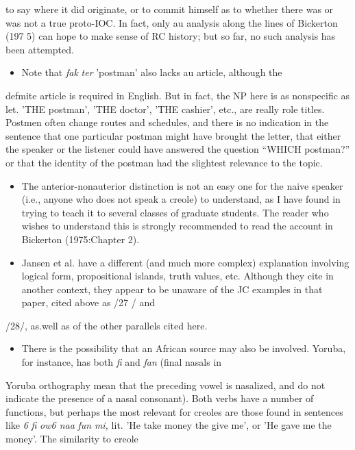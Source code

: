 \begin{itemize}
\begin{itemize}
\begin{itemize}
\begin{itemize}

to say where it did originate, or to commit himself as to whether there was or was not a true proto-IOC. In fact, only au analysis along the lines of Bickerton (197 5) can hope to make sense of RC history; but so far, no such analysis has been attempted.

\begin{itemize}
\item Note that \textit{fak} \textit{ter} 'postman' also lacks au article, although the
\end{itemize}

defmite article is required in English. But in fact, the NP here is as nonspecific as let. 'THE postman', 'THE doctor', 'THE cashier', etc., are really role titles. Postmen often change routes and schedules, and there is no indication in the sentence that one particular postman might have brought the letter, that either the speaker or the listener could have answered the question ``WHICH postman?'' or that the identity of the postman had the slightest relevance to the topic.

\begin{itemize}
\item The anterior-nonauterior distinction is not an easy one for the naive speaker (i.e., anyone who does not speak a creole) to under\-stand, as I have found in trying to teach it to several classes of graduate students. The reader who wishes to understand this is strongly recom\-mended to read the account in Bickerton (1975:Chapter 2).
\item Jansen et al. have a different (and much more complex) explanation involving logical form, propositional islands, truth values, etc. Although they cite \citet{Roberts1975} in another context, they appear to be unaware of the JC examples in that paper, cited above as /27 / and
\end{itemize}

/28/, as.well as of the other parallels cited here.

\begin{itemize}
\item There is the possibility that an African source may also be involved. Yoruba, for instance, has both \textit{fi} and \textit{fan }(final nasals in
\end{itemize}

Yoruba orthography mean that the preceding vowel is nasalized, and do not indicate the presence of a nasal consonant). Both verbs have a number of functions, but perhaps the most relevant for creoles are those found in sentences like \textit{6} \textit{fi} \textit{ow6 naa} \textit{fun} \textit{mi,} lit. 'He take money the give me', or 'He gave me the money'. The similarity to creole


\end{itemize}
\end{itemize}
\end{itemize}
\end{itemize}
